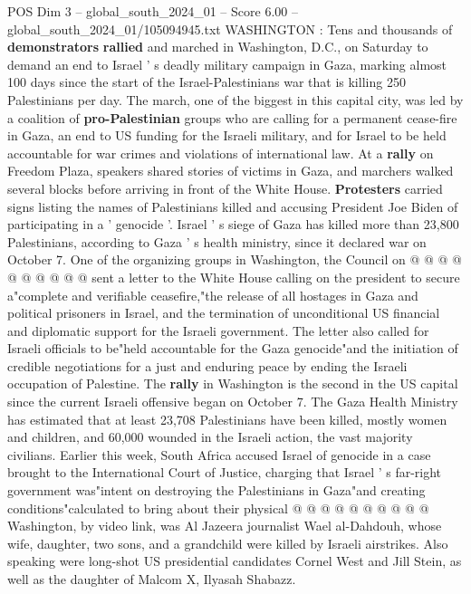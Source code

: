 \begin{textsample}{POS Dim 3 – global\_south\_2024\_01 – Score 6.00 – global\_south\_2024\_01/105094945.txt}  \label{ex:f3_pos_383}
WASHINGTON : Tens and thousands of \textbf{demonstrators} \textbf{rallied} and marched in Washington, D.C., on Saturday to demand an end to Israel ' s deadly military campaign in Gaza, marking almost 100 days since the start of the Israel-Palestinians war that is killing 250 Palestinians per day.
The march, one of the biggest in this capital city, was led by a coalition of \textbf{pro-Palestinian} groups who are calling for a permanent cease-fire in Gaza, an end to US funding for the Israeli military, and for Israel to be held accountable for war crimes and violations of international law.
At a \textbf{rally} on Freedom Plaza, speakers shared stories of victims in Gaza, and marchers walked several blocks before arriving in front of the White House. \textbf{Protesters} carried signs listing the names of Palestinians killed and accusing President Joe Biden of participating in a ' genocide '.
Israel ' s siege of Gaza has killed more than 23,800 Palestinians, according to Gaza ' s health ministry, since it declared war on October 7.
One of the organizing groups in Washington, the Council on @ @ @ @ @ @ @ @ @ @ sent a letter to the White House calling on the president to secure a"complete and verifiable ceasefire,"the release of all hostages in Gaza and political prisoners in Israel, and the termination of unconditional US financial and diplomatic support for the Israeli government.
The letter also called for Israeli officials to be"held accountable for the Gaza genocide"and the initiation of credible negotiations for a just and enduring peace by ending the Israeli occupation of Palestine.
The \textbf{rally} in Washington is the second in the US capital since the current Israeli offensive began on October 7.
The Gaza Health Ministry has estimated that at least 23,708 Palestinians have been killed, mostly women and children, and 60,000 wounded in the Israeli action, the vast majority civilians.
Earlier this week, South Africa accused Israel of genocide in a case brought to the International Court of Justice, charging that Israel ' s far-right government was"intent on destroying the Palestinians in Gaza"and creating conditions"calculated to bring about their physical @ @ @ @ @ @ @ @ @ @ Washington, by video link, was Al Jazeera journalist Wael al-Dahdouh, whose wife, daughter, two sons, and a grandchild were killed by Israeli airstrikes.
Also speaking were long-shot US presidential candidates Cornel West and Jill Stein, as well as the daughter of Malcom X, Ilyasah Shabazz.

\end{textsample}
